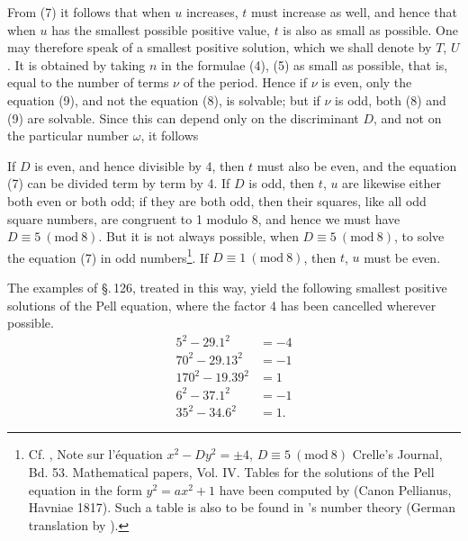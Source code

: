 From (7) it follows that when $u$ increases, $t$ must increase
as well, and hence that when $u$ has the smallest possible positive
value, $t$ is also as small as possible. One may therefore speak of a
smallest positive solution, which we shall denote by $T$, $U$. It is
obtained by taking $n$ in the formulae (4), (5) as small as possible,
that is, equal to the number of terms $\nu$ of the period. Hence if $\nu$
is even, only the equation (9), and not the equation (8), is
solvable; but if $\nu$ is odd, both (8) and (9) are solvable. Since
this can depend only on the discriminant $D$, and not on the particular
number $\omega$, it follows


If $D$ is even, and hence divisible by 4, then $t$ must also be
even, and the equation (7) can be divided term by term by 4.
If $D$ is odd, then $t$, $u$ are likewise either both even
or both odd; if they are both odd, then their squares,
like all odd square numbers, are congruent to
1 modulo 8, and hence we must have $D \equiv 5\ (\mathrm{mod}\ 8)$. But it is not
always possible, when $D \equiv 5\ (\mathrm{mod}\ 8)$, to solve the equation (7)
in odd numbers\footnote{Cf. , Note sur l'équation $x^2 - D y^2 = \pm 4$, $D \equiv 5\ (\mathrm{mod}\ 8)$
Crelle's Journal, Bd. 53. Mathematical papers, Vol. IV. Tables for the
solutions of the Pell equation in the form $y^2 = a x^2 + 1$ have been
computed by  (Canon Pellianus, Havniae 1817). Such a table is also to be found in 's
number theory (German translation by ).}. If $D \equiv 1\ (\mathrm{mod}\ 8)$, then
$t$, $u$ must be even.

The examples of \S.\,126, treated in this way, yield
the following smallest positive solutions of the Pell
equation, where the factor 4 has been cancelled wherever possible.
\[
\begin{aligned}
5^2 - 29.1^2 &= -4\\
70^2 - 29.13^2 &= -1\\
170^2 - 19.39^2 &= 1\\
6^2 - 37.1^2 &= -1\\
35^2 - 34.6^2 &= 1.
\end{aligned}
\]
